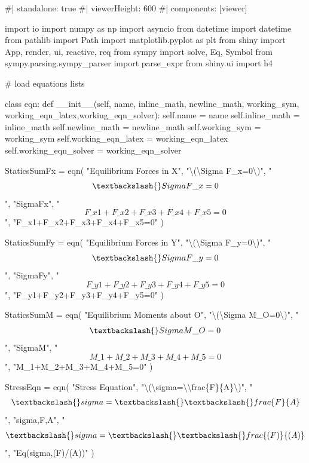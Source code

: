 \documentclass[
  letterpaper,
  DIV=11,
  numbers=noendperiod]{scrreprt}
\newenvironment{Shaded}{\begin{snugshade}}{\end{snugshade}}
\newcommand{\NormalTok}[1]{\textcolor[rgb]{0.00,0.23,0.31}{#1}}
\begin{document}
\begin{Shaded}
\begin{Highlighting}[]
\NormalTok{\#| standalone: true}
\NormalTok{\#| viewerHeight: 600}
\NormalTok{\#| components: [viewer]}



\NormalTok{import io}
\NormalTok{import numpy as np}
\NormalTok{import asyncio}
\NormalTok{from datetime import datetime}
\NormalTok{from pathlib import Path}
\NormalTok{import matplotlib.pyplot as plt}
\NormalTok{from shiny import App, render, ui, reactive, req}
\NormalTok{from sympy import solve, Eq, Symbol}
\NormalTok{from sympy.parsing.sympy\_parser import parse\_expr}
\NormalTok{from shiny.ui import h4}

\NormalTok{\# load equations lists}


\NormalTok{class eqn:}
\NormalTok{    def \_\_init\_\_(self, name, inline\_math, newline\_math, working\_sym, working\_eqn\_latex,working\_eqn\_solver):}
\NormalTok{        self.name = name}
\NormalTok{        self.inline\_math = inline\_math}
\NormalTok{        self.newline\_math = newline\_math}
\NormalTok{        self.working\_sym = working\_sym}
\NormalTok{        self.working\_eqn\_latex = working\_eqn\_latex}
\NormalTok{        self.working\_eqn\_solver = working\_eqn\_solver}

\NormalTok{StaticsSumFx = eqn(}
\NormalTok{    "Equilibrium Forces in X", }
\NormalTok{    "\textbackslash{}(\textbackslash{}Sigma F\_x=0\textbackslash{})", }
\NormalTok{    "$$\textbackslash{}Sigma F\_x=0$$", }
\NormalTok{    "SigmaFx",}
\NormalTok{    "$$F\_x1+F\_x2+F\_x3+F\_x4+F\_x5=0$$",}
\NormalTok{    "F\_x1+F\_x2+F\_x3+F\_x4+F\_x5=0"}
\NormalTok{)}

\NormalTok{StaticsSumFy = eqn(}
\NormalTok{    "Equilibrium Forces in Y", }
\NormalTok{    "\textbackslash{}(\textbackslash{}Sigma F\_y=0\textbackslash{})", }
\NormalTok{    "$$\textbackslash{}Sigma F\_y=0$$", }
\NormalTok{    "SigmaFy",}
\NormalTok{    "$$F\_y1+F\_y2+F\_y3+F\_y4+F\_y5=0$$",}
\NormalTok{    "F\_y1+F\_y2+F\_y3+F\_y4+F\_y5=0"}
\NormalTok{)}

\NormalTok{StaticsSumM = eqn(}
\NormalTok{    "Equilibrium Moments about O", }
\NormalTok{    "\textbackslash{}(\textbackslash{}Sigma M\_O=0\textbackslash{})", }
\NormalTok{    "$$\textbackslash{}Sigma M\_O=0$$", }
\NormalTok{    "SigmaM",}
\NormalTok{    "$$M\_1+M\_2+M\_3+M\_4+M\_5=0$$",}
\NormalTok{    "M\_1+M\_2+M\_3+M\_4+M\_5=0"}
\NormalTok{)}

\NormalTok{StressEqn = eqn(}
\NormalTok{    "Stress Equation", }
\NormalTok{    "\textbackslash{}(\textbackslash{}sigma=\textbackslash{}\textbackslash{}frac\{F\}\{A\}\textbackslash{})", }
\NormalTok{    "$$\textbackslash{}sigma=\textbackslash{}\textbackslash{}frac\{F\}\{A\}$$", }
\NormalTok{    "sigma,F,A",}
\NormalTok{    "$$\textbackslash{}sigma=\textbackslash{}\textbackslash{}frac\{(F)\}\{(A)\}$$",}
\NormalTok{    "Eq(sigma,(F)/(A))"}
\NormalTok{)}


\end{Highlighting}
\end{Shaded}
\end{document}
